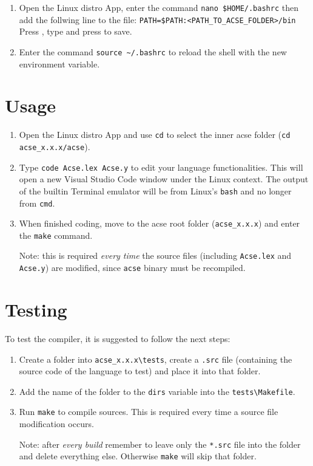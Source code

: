 \documentclass{article}
\begin{document}
\begin{enumerate}
    \item Open the Linux distro App, enter the command \verb+nano $HOME/.bashrc+ then add the follwing line to the file:
    \verb+PATH=$PATH:<PATH_TO_ACSE_FOLDER>/bin+ Press , type  and press  to save.
    \item Enter the command \verb+source ~/.bashrc+ to reload the shell with the new environment variable.

  \end{enumerate}
\section{Usage}
\begin{enumerate}
  \item Open the Linux distro App and use \verb+cd+ to select the inner acse folder \newline(\verb+cd acse_x.x.x/acse+).
  \item Type \verb+code Acse.lex Acse.y+ to edit your language functionalities. This will open a new Visual Studio Code window under the Linux context. The output of the builtin Terminal emulator will be from Linux's \verb+bash+ and no longer from \verb+cmd+.
  \item When finished coding, move to the acse root folder (\verb+acse_x.x.x+) and enter the \verb+make+ command. \newline \newline \begin{small} Note: this is required \emph{every time} the source files (including \verb+Acse.lex+ and \verb+Acse.y+) are modified, since \verb+acse+ binary must be recompiled.\end{small}
\end{enumerate}
\section{Testing}
To test the compiler, it is suggested to follow the next steps:
\begin{enumerate}
  \item Create a folder into \verb+acse_x.x.x\tests+, create a \verb+.src+ file (containing the source code of the language to test) and place it into that folder.
  \item Add the name of the folder to the \verb+dirs+ variable into the \verb+tests\Makefile+.
  \item Run \verb+make+ to compile sources. This is required every time a source file modification occurs.
  \newline \newline \begin{small}Note: after \emph{every build} remember to leave only the \verb+*.src+ file into the folder and delete everything else. Otherwise \verb+make+ will skip that folder.\end{small}
\end{enumerate}
\end{document}
